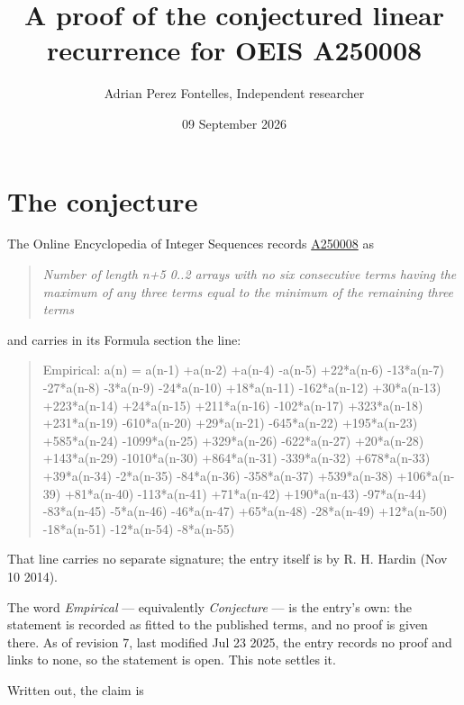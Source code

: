 \documentclass[11pt]{article}
\title{A proof of the conjectured linear recurrence for OEIS A250008}
\author{Adrian Perez Fontelles, Independent researcher}
\date{09 September 2026}
\theoremstyle{definition}
\begin{document}
\maketitle
\section{The conjecture}

The Online Encyclopedia of Integer Sequences records \href{https://oeis.org/A250008}{A250008} as

\begin{quote}\itshape Number of length n+5 0..2 arrays with no six consecutive terms having the maximum of any three terms equal to the minimum of the remaining three terms\end{quote}

and carries in its Formula section the line:

\begin{quote}\ttfamily Empirical: a(n) = a(n-1) +a(n-2) +a(n-4) -a(n-5) +22*a(n-6) -13*a(n-7) -27*a(n-8) -3*a(n-9) -24*a(n-10) +18*a(n-11) -162*a(n-12) +30*a(n-13) +223*a(n-14) +24*a(n-15) +211*a(n-16) -102*a(n-17) +323*a(n-18) +231*a(n-19) -610*a(n-20) +29*a(n-21) -645*a(n-22) +195*a(n-23) +585*a(n-24) -1099*a(n-25) +329*a(n-26) -622*a(n-27) +20*a(n-28) +143*a(n-29) -1010*a(n-30) +864*a(n-31) -339*a(n-32) +678*a(n-33) +39*a(n-34) -2*a(n-35) -84*a(n-36) -358*a(n-37) +539*a(n-38) +106*a(n-39) +81*a(n-40) -113*a(n-41) +71*a(n-42) +190*a(n-43) -97*a(n-44) -83*a(n-45) -5*a(n-46) -46*a(n-47) +65*a(n-48) -28*a(n-49) +12*a(n-50) -18*a(n-51) -12*a(n-54) -8*a(n-55)\end{quote}

That line carries no separate signature; the entry itself is by R. H. Hardin (Nov 10 2014).

The word {\itshape Empirical} --- equivalently {\itshape Conjecture} --- is the entry's own: the statement is recorded as fitted to the published terms, and no proof is given there. As of revision 7, last modified Jul 23 2025, the entry records no proof and links to none, so the statement is open. This note settles it.

Written out, the claim is
\end{document}
